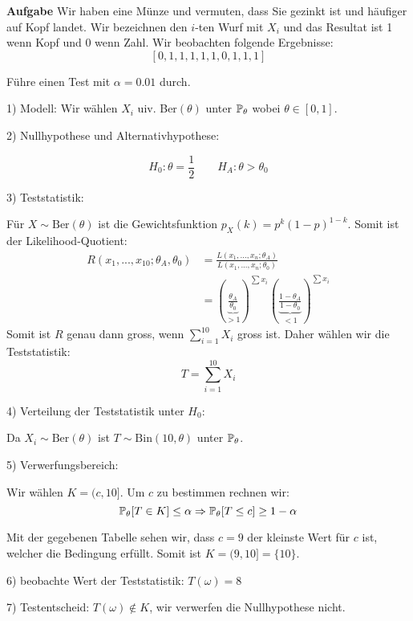 \hrulefill

\textbf{Aufgabe}
Wir haben eine Münze und vermuten, dass Sie gezinkt ist und häufiger auf Kopf landet. Wir bezeichnen den $i$-ten Wurf mit $X_i$ und das Resultat ist 1 wenn Kopf und 0 wenn Zahl. Wir beobachten folgende Ergebnisse:
$$[0,1,1,1,1,1,0,1,1,1]$$

Führe einen Test mit $\alpha = 0.01$ durch. \smallskip

1) Modell: \quad Wir wählen $X_i$ uiv. Ber$(\theta)$ unter $\mathbb{P}_\theta$ wobei $\theta \in [0,1]$. \smallskip

2) Nullhypothese und Alternativhypothese:

$$H_0: \theta = \frac{1}{2} \qquad H_A: \theta > \theta_0$$

3) Teststatistik:

Für $X \sim \text{Ber}(\theta)$ ist die Gewichtsfunktion $p_X(k) = p^k(1-p)^{1-k}$. Somit ist der Likelihood-Quotient:
\begin{align*}
	R(x_1,...,x_10; \theta_A, \theta_0) &= \frac{L(x_1,...,x_n; \theta_A)}{L(x_1,...,x_n; \theta_0)} \\
	&= \left( \underbrace{\frac{\theta_A}{\theta_0}}_{> 1} \right)^{\sum x_i} \left( \underbrace{\frac{1 - \theta_A}{1 - \theta_0}}_{< 1} \right)^{\sum x_i}
\end{align*}
 Somit ist $R$ genau dann gross, wenn $\sum_{i=1}^{10} X_i$ gross ist. Daher wählen wir die Teststatistik:
 $$T = \sum_{i=1}^{10}X_i$$

4) Verteilung der Teststatistik unter $H_0$:

Da $X_i \sim \text{Ber}(\theta)$ ist $T \sim \text{Bin}(10, \theta)$ unter $\mathbb{P}_\theta$. \smallskip

5) Verwerfungsbereich:

Wir wählen $K = (c, 10]$. Um $c$ zu bestimmen rechnen wir:
$$\mathbb{P}_\theta[T \in K] \leq \alpha \Rightarrow \mathbb{P}_\theta[T \leq c] \geq 1- \alpha$$

Mit der gegebenen Tabelle sehen wir, dass $c = 9$ der kleinste Wert für $c$ ist, welcher die Bedingung erfüllt. Somit ist $K = (9,10] = \{10\}$. \smallskip

6) beobachte Wert der Teststatistik: \quad $T(\omega) = 8$ \smallskip

7) Testentscheid: \quad $T(\omega) \notin K$, wir verwerfen die Nullhypothese nicht.

\hrulefill


